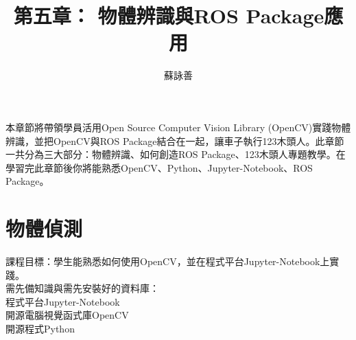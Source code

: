 \documentclass{article}
\title{第五章： 物體辨識與ROS Package應用}
\author{蘇詠善}
\date{} %
\begin{document}
\maketitle

本章節將帶領學員活用Open Source Computer Vision Library (OpenCV)實踐物體辨識，並把OpenCV與ROS Package結合在一起，讓車子執行123木頭人。此章節一共分為三大部分：物體辨識、如何創造ROS Package、123木頭人專題教學。在學習完此章節後你將能熟悉OpenCV、Python、Jupyter-Notebook、ROS Package。
\section{物體偵測}
課程目標：學生能熟悉如何使用OpenCV，並在程式平台Jupyter-Notebook上實踐。
\\需先備知識與需先安裝好的資料庫：
\\程式平台Jupyter-Notebook
\\開源電腦視覺函式庫OpenCV
\\開源程式Python
\end{document}
